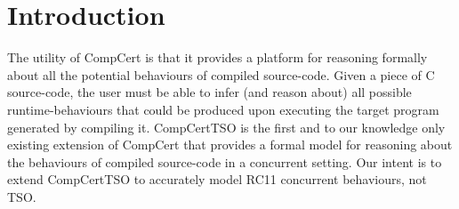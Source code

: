 \section{Introduction}

The utility of CompCert is that it provides a platform for reasoning formally about all the potential behaviours of compiled source-code. 
Given a piece of C source-code, the user must be able to infer (and reason about) all possible runtime-behaviours that could be produced upon executing the target program generated by compiling it. 
CompCertTSO is the first and to our knowledge only existing extension of CompCert that provides a formal model for reasoning about the behaviours of compiled source-code in a concurrent setting.
Our intent is to extend CompCertTSO to accurately model RC11 concurrent behaviours, not TSO.  



